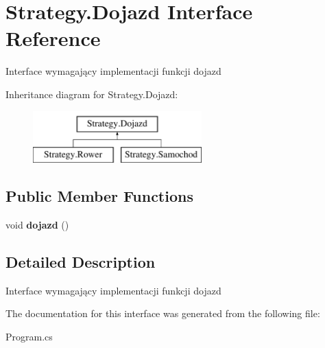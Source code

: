 \hypertarget{interface_strategy_1_1_dojazd}{}\section{Strategy.\+Dojazd Interface Reference}
\label{interface_strategy_1_1_dojazd}


Interface wymagający implementacji funkcji dojazd  


Inheritance diagram for Strategy.\+Dojazd\+:\begin{figure}[H]
\begin{center}
\leavevmode
\includegraphics[height=2.000000cm]{interface_strategy_1_1_dojazd}
\end{center}
\end{figure}
\subsection*{Public Member Functions}
\begin{DoxyCompactItemize}
\item 
\mbox{\label{interface_strategy_1_1_dojazd_a232e5c090ce441757dbe515a518ffd7f}} 
void {\bfseries dojazd} ()
\end{DoxyCompactItemize}


\subsection{Detailed Description}
Interface wymagający implementacji funkcji dojazd 



The documentation for this interface was generated from the following file\+:\begin{DoxyCompactItemize}
\item 
Program.\+cs\end{DoxyCompactItemize}
